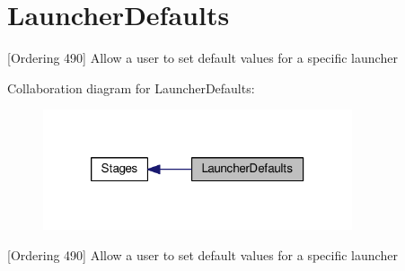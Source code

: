 \hypertarget{group___launcher_defaults}{\section{Launcher\-Defaults}
\label{group___launcher_defaults}
}


\mbox{[}Ordering 490\mbox{]} Allow a user to set default values for a specific launcher  


Collaboration diagram for Launcher\-Defaults\-:
\nopagebreak
\begin{figure}[H]
\begin{center}
\leavevmode
\includegraphics[width=258pt]{group___launcher_defaults}
\end{center}
\end{figure}
\mbox{[}Ordering 490\mbox{]} Allow a user to set default values for a specific launcher 